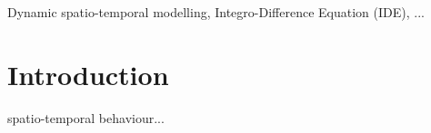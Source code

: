 \documentclass[11pt,draftcls,onecolumn,peerreview]{IEEEtran}
\begin{document}







\maketitle


\begin{abstract}

\end{abstract}

\begin{IEEEkeywords}
Dynamic spatio-temporal modelling, Integro-Difference Equation (IDE), ...
\end{IEEEkeywords}






%
\IEEEpeerreviewmaketitle



\section{Introduction}
% 
% 
% 
% 
 spatio-temporal behaviour...  %
\end{document}
